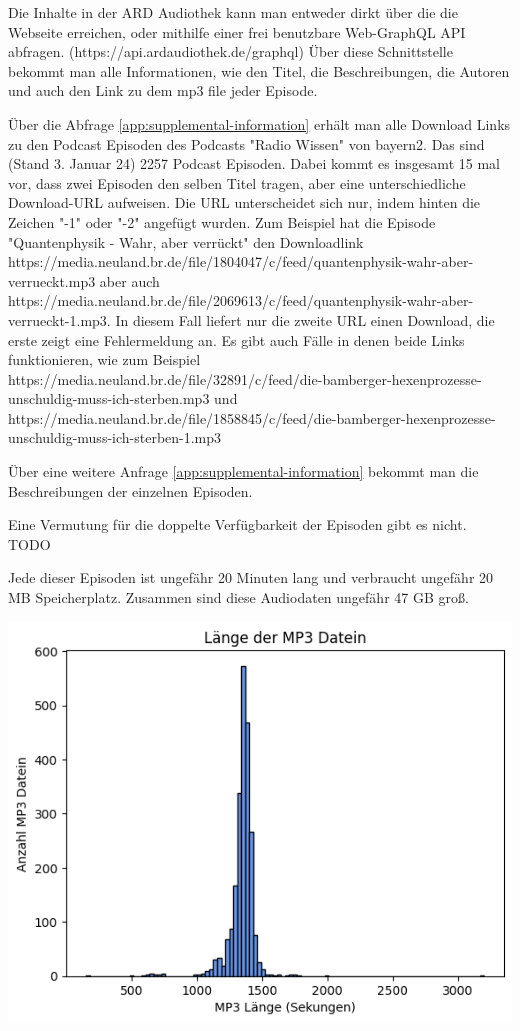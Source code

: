 Die Inhalte in der ARD Audiothek kann man entweder dirkt über die die Webseite erreichen, oder mithilfe einer frei benutzbare Web-GraphQL API abfragen.
(https://api.ardaudiothek.de/graphql) 
Über diese Schnittstelle bekommt man alle Informationen, wie den Titel, die Beschreibungen, die Autoren und auch den Link zu dem mp3 file jeder Episode.

Über die Abfrage \autoref{app:supplemental-information} erhält man alle Download Links zu den Podcast Episoden des Podcasts "Radio Wissen" von bayern2.
Das sind (Stand 3. Januar 24) 2257 Podcast Episoden.
Dabei kommt es insgesamt 15 mal vor, dass zwei Episoden den selben Titel tragen, aber eine unterschiedliche Download-URL aufweisen.
Die URL unterscheidet sich nur, indem hinten die Zeichen "-1" oder "-2" angefügt wurden.
Zum Beispiel hat die Episode "Quantenphysik - Wahr, aber verrückt" den Downloadlink https://media.neuland.br.de/file/1804047/c/feed/quantenphysik-wahr-aber-verrueckt.mp3 aber auch https://media.neuland.br.de/file/2069613/c/feed/quantenphysik-wahr-aber-verrueckt-1.mp3.
In diesem Fall liefert nur die zweite URL einen Download, die erste zeigt eine Fehlermeldung an.
Es gibt auch Fälle in denen beide Links funktionieren, wie zum Beispiel 
https://media.neuland.br.de/file/32891/c/feed/die-bamberger-hexenprozesse-unschuldig-muss-ich-sterben.mp3 und
https://media.neuland.br.de/file/1858845/c/feed/die-bamberger-hexenprozesse-unschuldig-muss-ich-sterben-1.mp3   

Über eine weitere Anfrage \autoref{app:supplemental-information} bekommt man die Beschreibungen der einzelnen Episoden. 

Eine Vermutung für die doppelte Verfügbarkeit der Episoden gibt es nicht. TODO

Jede dieser Episoden ist ungefähr 20 Minuten lang und verbraucht ungefähr 20 MB Speicherplatz.
Zusammen sind diese Audiodaten ungefähr 47 GB groß.

\includegraphics[width=\linewidth]{figures/mp3_length.png}

